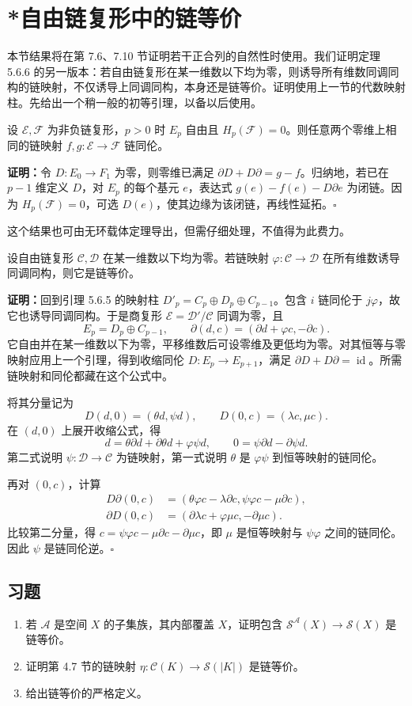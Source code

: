 \section{*自由链复形中的链等价}
本节结果将在第 7.6、7.10 节证明若干正合列的自然性时使用。我们证明定理 5.6.6 的另一版本：若自由链复形在某一维数以下均为零，则诱导所有维数同调同构的链映射，不仅诱导上同调同构，本身还是链等价。证明使用上一节的代数映射柱。先给出一个稍一般的初等引理，以备以后使用。

设 $\mathcal E,\mathcal F$ 为非负链复形，$p>0$ 时 $E_p$ 自由且 $H_p(\mathcal F)=0$。则任意两个零维上相同的链映射 $f,g:\mathcal E\to\mathcal F$ 链同伦。

\textbf{证明：}令 $D:E_0\to F_1$ 为零，则零维已满足 $\partial D+D\partial=g-f$。归纳地，若已在 $p-1$ 维定义 $D$，对 $E_p$ 的每个基元 $e$，表达式 $g(e)-f(e)-D\partial e$ 为闭链。因为 $H_p(\mathcal F)=0$，可选 $D(e)$，使其边缘为该闭链，再线性延拓。\hfill$\square$

这个结果也可由无环载体定理导出，但需仔细处理，不值得为此费力。

设自由链复形 $\mathcal C,\mathcal D$ 在某一维数以下均为零。若链映射 $\varphi:\mathcal C\to\mathcal D$ 在所有维数诱导同调同构，则它是链等价。

\textbf{证明：}回到引理 5.6.5 的映射柱 $D'_p=C_p\oplus D_p\oplus C_{p-1}$。包含 $i$ 链同伦于 $j\varphi$，故它也诱导同调同构。于是商复形 $\mathcal E=\mathcal D'/\mathcal C$ 同调为零，且
\[
E_p=D_p\oplus C_{p-1},\qquad\partial(d,c)=(\partial d+\varphi c,-\partial c).
\]
它自由并在某一维数以下为零，平移维数后可设零维及更低均为零。对其恒等与零映射应用上一个引理，得到收缩同伦 $D:E_p\to E_{p+1}$，满足 $\partial D+D\partial=\operatorname{id}$。所需链映射和同伦都藏在这个公式中。

将其分量记为
\[
D(d,0)=(\theta d,\psi d),\qquad D(0,c)=(\lambda c,\mu c).
\]
在 $(d,0)$ 上展开收缩公式，得
\[
d=\theta\partial d+\partial\theta d+\varphi\psi d,\qquad
0=\psi\partial d-\partial\psi d.
\]
第二式说明 $\psi:\mathcal D\to\mathcal C$ 为链映射，第一式说明 $\theta$ 是 $\varphi\psi$ 到恒等映射的链同伦。

再对 $(0,c)$，计算
\begin{align*}
D\partial(0,c)&=(\theta\varphi c-\lambda\partial c,\psi\varphi c-\mu\partial c),\\
\partial D(0,c)&=(\partial\lambda c+\varphi\mu c,-\partial\mu c).
\end{align*}
比较第二分量，得 $c=\psi\varphi c-\mu\partial c-\partial\mu c$，即 $\mu$ 是恒等映射与 $\psi\varphi$ 之间的链同伦。因此 $\psi$ 是链同伦逆。\hfill$\square$

\subsection*{习题}
\begin{enumerate}
\item 若 $\mathcal A$ 是空间 $X$ 的子集族，其内部覆盖 $X$，证明包含 $\mathcal S^{\mathcal A}(X)\to\mathcal S(X)$ 是链等价。
\item 证明第 4.7 节的链映射 $\eta:\mathcal C(K)\to\mathcal S(|K|)$ 是链等价。
\item 给出链等价的严格定义。
\end{enumerate}
